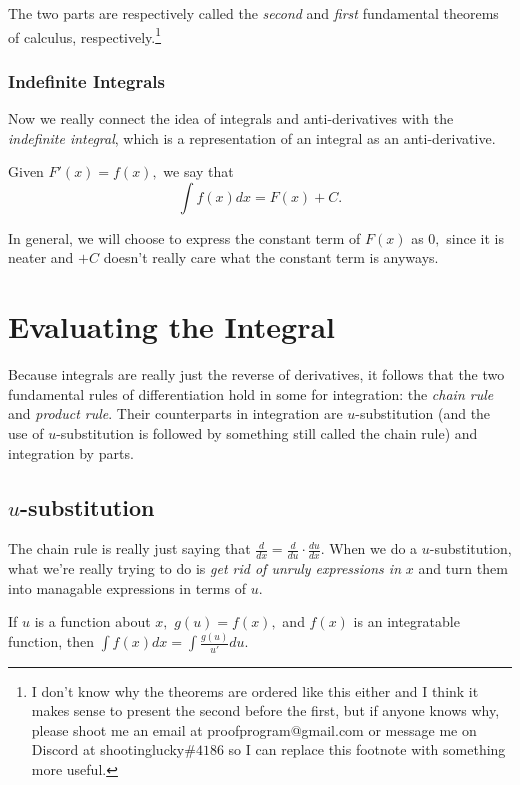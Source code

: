 \documentclass[mast]{lucky}
\begin{document}
The two parts are respectively called the \emph{second} and \emph{first} fundamental theorems of calculus, respectively.\footnote{I don't know why the theorems are ordered like this either and I think it makes sense to present the second before the first, but if anyone knows why, please shoot me an email at proofprogram@gmail.com or message me on Discord at shootinglucky$\#4186$ so I can replace this footnote with something more useful.}

\subsubsection{Indefinite Integrals}

Now we really connect the idea of integrals and anti-derivatives with the \emph{indefinite integral}, which is a representation of an integral as an anti-derivative.

\begin{defi}
Given $F'(x)=f(x),$ we say that
\[\int f(x)dx=F(x)+C.\]
\end{defi}

In general, we will choose to express the constant term of $F(x)$ as $0,$ since it is neater and $+C$ doesn't really care what the constant term is anyways.

\section{Evaluating the Integral}

Because integrals are really just the reverse of derivatives, it follows that the two fundamental rules of differentiation hold in some for integration: the \emph{chain rule} and \emph{product rule}. Their counterparts in integration are $u$-substitution (and the use of $u$-substitution is followed by something still called the chain rule) and integration by parts.

\subsection{$u$-substitution}

The chain rule is really just saying that $\frac{d}{dx}=\frac{d}{du}\cdot \frac{du}{dx}.$ When we do a $u$-substitution, what we're really trying to do is \emph{get rid of unruly expressions in} $x$ and turn them into managable expressions in terms of $u.$

\begin{theo}
If $u$ is a function about $x,$ $g(u)=f(x),$ and $f(x)$ is an integratable function, then $\int f(x) dx = \int \frac{g(u)}{u'}du.$
\end{theo}
\end{document}
